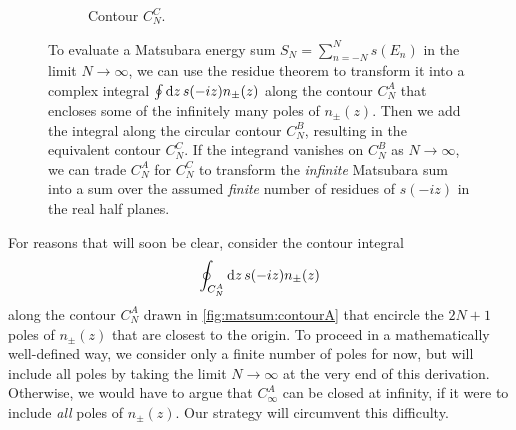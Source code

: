 \begin{figure}
\begin{subfigure}{0.32\textwidth}
\caption{\label{fig:matsum:contourC}Contour $C^C_N$.}
\end{subfigure}
\caption{\label{fig:matsum:contours}%
	To evaluate a Matsubara energy sum $S_N = \sum_{n=-N}^N s(E_n)$ in the limit $N \rightarrow \infty$, we can use the residue theorem to transform it into a complex integral $\oint \mathop{}\!\mathrm{d} z \, s(-iz) n_\pm(z)$ along the contour $C^A_N$ that encloses some of the infinitely many poles of $n_\pm(z)$.
	Then we add the integral along the circular contour $C_N^B$, resulting in the equivalent contour $C^C_N$.
	If the integrand vanishes on $C_N^B$ as $N \rightarrow \infty$, we can trade $C_N^A$ for $C_N^C$ to transform the \emph{infinite} Matsubara sum into a sum over the assumed \emph{finite} number of residues of $s(-iz)$ in the real half planes.
}
\end{figure}

For reasons that will soon be clear, consider the contour integral
\begin{equation}
	\oint_{C_N^A} \mathop{}\!\mathrm{d} z \, s(-iz) n_\pm(z)
\label{eq:matsum:contour_integral}
\end{equation}
along the contour $C_N^A$ drawn in \cref{fig:matsum:contourA} that encircle the $2N+1$ poles of $n_\pm(z)$ that are closest to the origin.
To proceed in a mathematically well-defined way, we consider only a finite number of poles for now, but will include all poles by taking the limit $N \rightarrow \infty$ at the very end of this derivation.
Otherwise, we would have to argue that $C_\infty^A$ can be closed at infinity, if it were to include \emph{all} poles of $n_\pm(z)$.
Our strategy will circumvent this difficulty.

